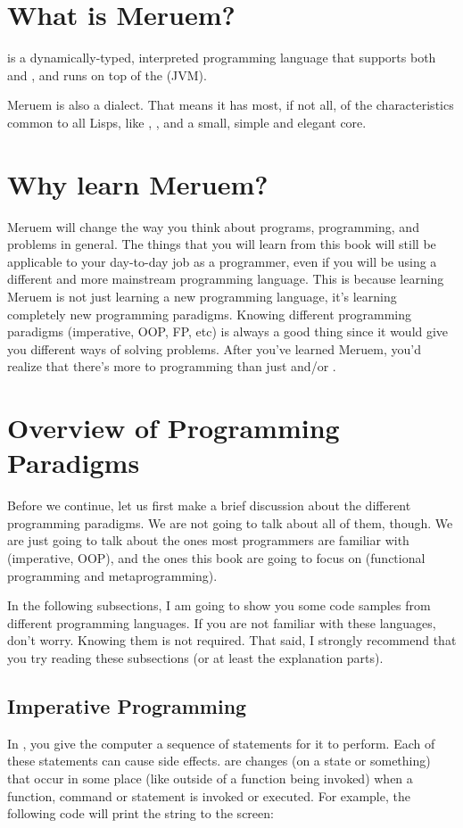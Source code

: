 \section{What is Meruem?}
 is a dynamically-typed, interpreted programming language that supports both  and , and runs on top of the  (JVM).

Meruem is also a  dialect. That means it has most, if not all, of the characteristics common to all Lisps, like , , and a small, simple and elegant core.

\section{Why learn Meruem?}
Meruem will change the way you think about programs, programming, and problems in general. The things that you will learn from this book will still be applicable to your day-to-day job as a programmer, even if you will be using a different and more mainstream programming language. This is because learning Meruem is not just learning a new programming language, it's learning completely new programming paradigms. Knowing different programming paradigms (imperative, OOP, FP, etc) is always a good thing since it would give you different ways of solving problems. After you've learned Meruem, you'd realize that there's more to programming than just  and/or .

\section{Overview of Programming Paradigms}
Before we continue, let us first make a brief discussion about the different programming paradigms. We are not going to talk about all of them, though. We are just going to talk about the ones most programmers are familiar with (imperative, OOP), and the ones this book are going to focus on (functional programming and metaprogramming).

In the following subsections, I am going to show you some code samples from different programming languages. If you are not familiar with these languages, don't worry. Knowing them is not required. That said, I strongly recommend that you try reading these subsections (or at least the explanation parts).

\subsection{Imperative Programming}
In , you give the computer a sequence of statements for it to perform. Each of these statements can cause side effects.  are changes (on a state or something) that occur in some place (like outside of a function being invoked) when a function, command or statement is invoked or executed. For example, the following code will print the string  to the screen:

